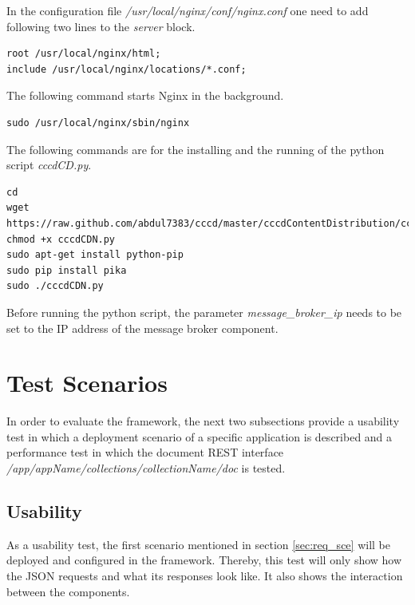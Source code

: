 In the configuration file \textit{/usr/local/nginx/conf/nginx.conf} one need to add following two lines to the \textit{server} block.

\begin{code}
\begin{verbatim}
root /usr/local/nginx/html;
include /usr/local/nginx/locations/*.conf;
\end{verbatim}
\end{code}
 
The following command starts Nginx in the background.

\begin{code}
\begin{verbatim}
sudo /usr/local/nginx/sbin/nginx
\end{verbatim}
\end{code}

The following commands are for the installing and the running of the python script \textit{cccdCD.py}.

\begin{code}
\begin{verbatim}
cd
wget https://raw.github.com/abdul7383/cccd/master/cccdContentDistribution/cccdCDN.py
chmod +x cccdCDN.py
sudo apt-get install python-pip
sudo pip install pika
sudo ./cccdCDN.py
\end{verbatim}
\end{code}

Before running the python script, the parameter \textit{message\_broker\_ip} needs to be set to the IP address of the message broker component.

\section{Test Scenarios\label{sec:eval__te_sc}}
In order to evaluate the framework, the next two subsections provide a usability test in which a deployment scenario of a specific application is described and a performance test in which the document REST interface \textit{/app/{appName}/collections/{collectionName}/doc} is tested.

\subsection{Usability\label{seq:eval_usab}}
As a usability test, the first scenario mentioned in section \ref{sec:req_sce} will be deployed and configured in the framework. Thereby, this test will only show how the \ac{JSON} requests and what its responses look like. It also shows the interaction between the components.

